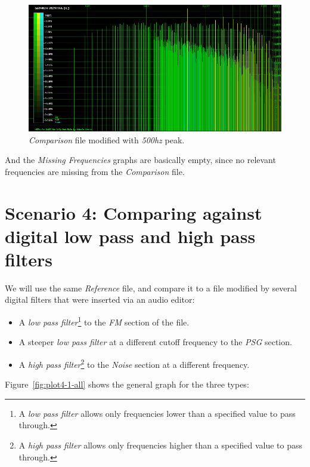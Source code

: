\documentclass[10pt,a4paper]{report}
\newcommand{\hz}[1]{\textit{\mbox{#1\acrshort{hz}}}}
\begin{document}
\begin{figure}[H]
	\centering
	\includegraphics[width=1.0\linewidth]{images/interpretation/Plot3-Spectrogram-500hz.png}
	\caption[Reference File]{\textit{Comparison} file modified with \hz{500} peak.}
	\label{fig:plot3-spectrogram-500Hz}
\end{figure}


And the \textit{Missing Frequencies} graphs are basically empty, since no relevant frequencies are missing from the \textit{Comparison} file.

\section{Scenario 4: Comparing against digital low pass and high pass filters}

We will use the same \textit{Reference} file, and compare it to a file modified by several digital filters that were inserted via an audio editor:

\begin{itemize}
	\item A \textit{low pass filter}\footnote{A \textit{low pass filter} allows only frequencies lower than a specified value to pass through.} to the \textit{FM} section of the file.
	\item A steeper \textit{low pass filter} at a different cutoff frequency to the \textit{PSG} section.
	\item A \textit{high pass filter}\footnote{A \textit{high pass filter} allows only frequencies higher than a specified value to pass through.} to the \textit{Noise} section at a different frequency.
\end{itemize}

Figure~\ref{fig:plot4-1-all} shows the general graph for the three types:
\end{document}
